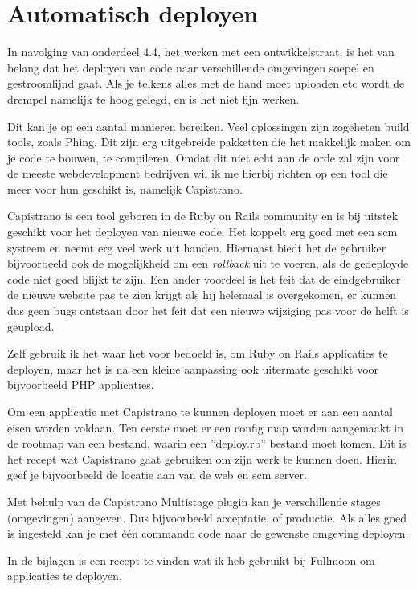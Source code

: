 \section{Automatisch deployen}

In navolging van onderdeel 4.4, het werken met een ontwikkelstraat, is het van belang dat het deployen van code naar verschillende omgevingen soepel en gestroomlijnd gaat. Als je telkens alles met de hand moet uploaden etc wordt de drempel namelijk te hoog gelegd, en is het niet fijn werken.

Dit kan je op een aantal manieren bereiken. Veel oplossingen zijn zogeheten build tools, zoals Phing. Dit zijn erg uitgebreide pakketten die het makkelijk maken om je code te bouwen, te compileren. Omdat dit niet echt aan de orde zal zijn voor de meeste webdevelopment bedrijven wil ik me hierbij richten op een tool die meer voor hun geschikt is, namelijk Capistrano.

Capistrano is een tool geboren in de Ruby on Rails community en is bij uitstek geschikt voor het deployen van nieuwe code. Het koppelt erg goed met een {\sc scm} systeem en neemt erg veel werk uit handen. Hiernaast biedt het de gebruiker bijvoorbeeld ook de mogelijkheid om een \emph{rollback} uit te voeren, als de gedeployde code niet goed blijkt te zijn. Een ander voordeel is het feit dat de eindgebruiker de nieuwe website pas te zien krijgt als hij helemaal is overgekomen, er kunnen dus geen bugs ontstaan door het feit dat een nieuwe wijziging pas voor de helft is geupload.

Zelf gebruik ik het waar het voor bedoeld is, om Ruby on Rails applicaties te deployen, maar het is na een kleine aanpassing ook uitermate geschikt voor bijvoorbeeld PHP applicaties.

Om een applicatie met Capistrano te kunnen deployen moet er aan een aantal eisen worden voldaan. Ten eerste moet er een config map worden aangemaakt in de rootmap van een bestand, waarin een ''deploy.rb'' bestand moet komen. Dit is het recept wat Capistrano gaat gebruiken om zijn werk te kunnen doen. Hierin geef je bijvoorbeeld de locatie aan van de web en {\sc scm} server.

Met behulp van de Capistrano Multistage plugin\cite{capistranomultistage} kan je verschillende stages (omgevingen) aangeven. Dus bijvoorbeeld acceptatie, of productie. Als alles goed is ingesteld kan je met \'{e}\'{e}n commando code naar de gewenste omgeving deployen.



In de bijlagen is een recept te vinden wat ik heb gebruikt bij Fullmoon om applicaties te deployen.
